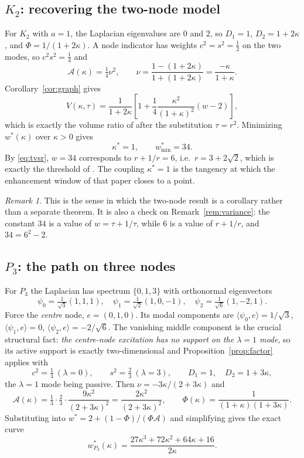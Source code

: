 \documentclass[11pt]{article}
\theoremstyle{plain}
\theoremstyle{definition}
\theoremstyle{remark}
\newtheorem{remark}[theorem]{Remark}
\newcommand{\Aco}{\mathcal{A}}
\begin{document}
\subsection{$K_2$: recovering the two-node model}\label{sec:K2}

For $K_2$ with $a=1$, the Laplacian eigenvalues are $0$ and $2$, so $D_1=1$, $D_2=1+2\kappa$, and
$\Phi=1/(1+2\kappa)$. A node indicator has weights $c^2=s^2=\tfrac12$ on the two modes, so
$c^2s^2=\tfrac14$ and
\[
  \Aco(\kappa)=\tfrac14\nu^2,\qquad \nu=\frac{1-(1+2\kappa)}{1+(1+2\kappa)}=\frac{-\kappa}{1+\kappa}.
\]
Corollary~\ref{cor:graph} gives
\begin{equation}
  V(\kappa,\tau)=\frac{1}{1+2\kappa}\left[1+\frac14\frac{\kappa^2}{(1+\kappa)^2}(w-2)\right],
  \label{eq:K2V}
\end{equation}
which is exactly the volume ratio of \cite{DeJesus2026ou} after the substitution $\tau=r^2$.
Minimizing $w^{*}(\kappa)$ over $\kappa>0$ gives
\begin{equation}
  \kappa^{*}=1,\qquad w^{*}_{\min}=34. \label{eq:K2min}
\end{equation}
By \eqref{eq:tvsr}, $w=34$ corresponds to $r+1/r=6$, i.e.\ $r=3+2\sqrt2$, which is exactly the
threshold of \cite{DeJesus2026ou}. The coupling $\kappa^{*}=1$ is the tangency at which the
enhancement window of that paper closes to a point.

\begin{remark}
This is the sense in which the two-node result is a corollary rather than a separate theorem. It
is also a check on Remark~\ref{rem:variance}: the constant $34$ is a value of $w=\tau+1/\tau$,
while $6$ is a value of $r+1/r$, and $34=6^2-2$.
\end{remark}

\subsection{$P_3$: the path on three nodes}\label{sec:P3}

For $P_3$ the Laplacian has spectrum $\{0,1,3\}$ with orthonormal eigenvectors
\[
  \psi_0=\tfrac{1}{\sqrt3}(1,1,1),\quad
  \psi_1=\tfrac{1}{\sqrt2}(1,0,-1),\quad
  \psi_2=\tfrac{1}{\sqrt6}(1,-2,1).
\]
Force the \emph{centre} node, $e=(0,1,0)$. Its modal components are
$\langle\psi_0,e\rangle=1/\sqrt3$, $\langle\psi_1,e\rangle=0$, $\langle\psi_2,e\rangle=-2/\sqrt6$.
The vanishing middle component is the crucial structural fact: \emph{the centre-node excitation
has no support on the $\lambda=1$ mode}, so its active support is exactly two-dimensional and
Proposition~\ref{prop:factor} applies with
\[
  c^2=\tfrac13\ (\lambda=0),\qquad s^2=\tfrac23\ (\lambda=3),\qquad
  D_1=1,\quad D_2=1+3\kappa,
\]
the $\lambda=1$ mode being passive. Then $\nu=-3\kappa/(2+3\kappa)$ and
\[
  \Aco(\kappa)=\tfrac13\cdot\tfrac23\cdot\frac{9\kappa^2}{(2+3\kappa)^2}
  =\frac{2\kappa^2}{(2+3\kappa)^2},
  \qquad
  \Phi(\kappa)=\frac{1}{(1+\kappa)(1+3\kappa)}.
\]
Substituting into $w^{*}=2+(1-\Phi)/(\Phi\Aco)$ and simplifying gives the exact curve
\begin{equation}
  w^{*}_{P_3}(\kappa)=\frac{27\kappa^3+72\kappa^2+64\kappa+16}{2\kappa}. \label{eq:P3curve}
\end{equation}
\end{document}
